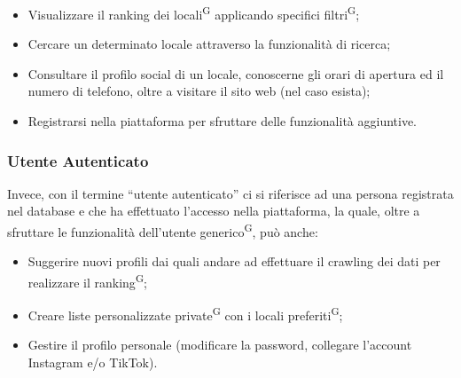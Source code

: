 \begin{itemize}
  \item Visualizzare il ranking dei locali\textsuperscript{G} applicando specifici filtri\textsuperscript{G};
  \item Cercare un determinato locale attraverso la funzionalità di ricerca;
  \item Consultare il profilo social di un locale, conoscerne gli orari di apertura ed il numero di telefono, oltre a visitare il sito web (nel caso esista);
  \item Registrarsi nella piattaforma per sfruttare delle funzionalità aggiuntive.
\end{itemize}

\subsubsection{Utente Autenticato}

Invece, con il termine “utente autenticato” ci si riferisce ad una persona registrata nel database e che ha effettuato l'accesso nella piattaforma, la quale, oltre a sfruttare le funzionalità dell’utente generico\textsuperscript{G}, può anche:

\begin{itemize}
  \item Suggerire nuovi profili dai quali andare ad effettuare il crawling dei dati per realizzare il ranking\textsuperscript{G};
  \item Creare liste personalizzate private\textsuperscript{G} con i locali preferiti\textsuperscript{G};
  \item Gestire il profilo personale (modificare la password, collegare l'account Instagram e/o TikTok).
\end{itemize}




